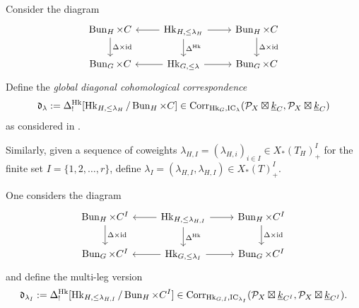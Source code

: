 \documentclass[reqno]{amsart}
\numberwithin{equation}{section}
\numberwithin{equation}{section}
\begin{document}
Consider the diagram \begin{equation}
    \begin{tikzcd}
        \Bun_H\times C \ar[d, "\D\times\id"] & \Hk_{H,\leq\lambda_H} \ar[l] \ar[r] \ar[d, "\D^{\Hk}"] & \Bun_H \times C \ar[d, "\D\times\id"] \\
        \Bun_G\times C & \Hk_{G,\leq\lambda} \ar[l] \ar[r]  & \Bun_G \times C
    \end{tikzcd}
\end{equation}
Define the \emph{global diagonal cohomological correspondence} \begin{equation}\label{eq:diagcorglob}\mathfrak{d}_{\lambda}:=\Delta^{\operatorname{Hk}}_![\operatorname{Hk}_{H,\leq\lambda_H}/\operatorname{Bun}_H\times C]\in \mathrm{Corr}_{\operatorname{Hk}_{G},\operatorname{IC}_{\lambda}}(\mathcal{P}_X\boxtimes\underline{k}_C,\mathcal{P}_X\boxtimes\underline{k}_C)\end{equation} as considered in \cite[\S1.3.2]{wang2025specialcycleshtukascategorical}.

Similarly, given a sequence of coweights $\lambda_{H,I}=(\lambda_{H,i})_{i\in I}\in X_*(T_H)^I_+$ for the finite set $I=\{1,2,\dots,r\}$, define $\lambda_I=(\lambda_{H,I},\lambda_{H,I})\in X_*(T)^I_+$.


One considers the diagram \begin{equation}
    \begin{tikzcd}
        \Bun_H\times C^I \ar[d, "\D\times\id"] & \Hk_{H,\leq\lambda_{H,I}} \ar[l] \ar[r] \ar[d, "\D^{\Hk}"] & \Bun_H \times C^I \ar[d, "\D\times\id"] \\
        \Bun_G\times C^I & \Hk_{G,\leq\lambda_I} \ar[l] \ar[r]  & \Bun_G \times C^I
    \end{tikzcd}
\end{equation} and define the multi-leg version \begin{equation}\label{eq:diagcorglobmulti}
    \mathfrak{d}_{\lambda_I}:=\Delta^{\operatorname{Hk}}_![\operatorname{Hk}_{H,\leq\lambda_{H,I}}/\operatorname{Bun}_H\times C^I]\in \mathrm{Corr}_{\operatorname{Hk}_{G,I},\operatorname{IC}_{\lambda_I}}(\mathcal{P}_X\boxtimes\underline{k}_{C^I},\mathcal{P}_X\boxtimes\underline{k}_{C^I}).
\end{equation}

\end{document}
